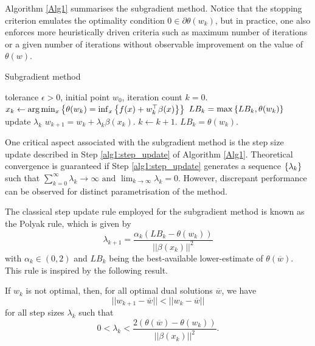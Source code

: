 Algorithm \ref{Alg1} summarises the subgradient method. Notice that the stopping criterion emulates the optimality condition $0 \in \partial\theta(w_k)$, but in practice, one also enforces more heuristically driven criteria such as maximum number of iterations or a given number of iterations without observable improvement on the value of $\theta(w)$. 

\begin{algorithm}[H]
\caption{Subgradient method} \label{Alg1}
\begin{algorithmic}[1] 
 tolerance $\epsilon > 0$, initial point $w_0$, iteration count $k = 0$. 
        \State $x_k \gets \arg \min_x \left\{ \theta(w_k) = \inf_x \left\{ f(x) + w_k^\top\beta(x) \right \} \right \}$ 
        \State $LB_k = \max \left\{ LB_k, \theta(w_k) \right \}$
        \State update $\lambda_k$ \label{alg1:step_update}
        \State $w_{k+1} = w_k + \lambda_k  \beta(x_k)$.
    \State $k \leftarrow k+1$.    
\EndWhile
{} $LB_k = \theta(w_k)$.
\end{algorithmic}
\end{algorithm}

One critical aspect associated with the subgradient method is the step size update described in Step \ref{alg1:step_update} of Algorithm \ref{Alg1}. Theoretical convergence is guaranteed if Step \ref{alg1:step_update} generates a sequence $\left\{ \lambda_k \right \}$ such that
$\sum_{k=0}^{\infty}\lambda_k \rightarrow \infty \text{ and } \lim_{k \rightarrow \infty}\lambda_k = 0$. However, discrepant performance can be observed for distinct parametrisation of the method.

The classical step update rule employed for the subgradient method is known as the Polyak rule, which is given by
$$
\lambda_{k+1} = \frac{\alpha_k(LB_k - \theta(w_k))}{||\beta(x_k)||^2}
$$ 
with $\alpha_k \in (0,2)$ and $LB_k$ being the best-available lower-estimate of $\theta(\overline{w})$. This rule is inspired by the following result.

\begin{proposition}
If $w_k$ is not optimal, then, for all optimal dual solutions $\overline{w}$, we have
\vspace{-6pt}
%
$$|| w_{k+1} - \overline{w}|| < || w_{k} - \overline{w}||$$
%
\vspace{-6pt}
for all step sizes $\lambda_k$ such that 
%
$$0 < \lambda_k < \frac{2(\theta(\overline{w}) - \theta(w_k))}{||\beta(x_k)||^2}.$$
\end{proposition}

